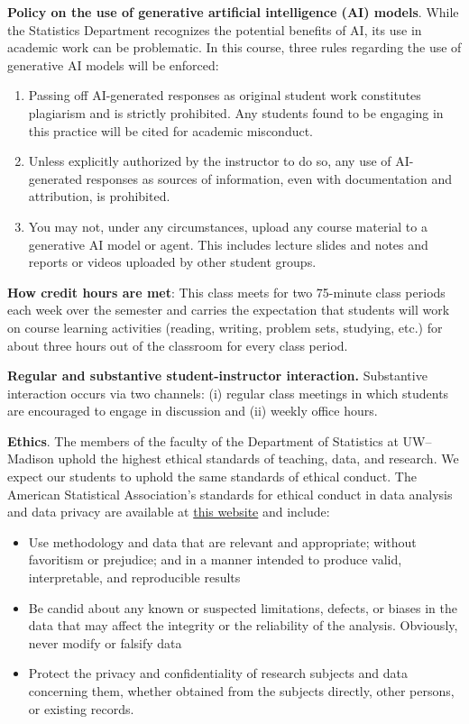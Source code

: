 \documentclass[11pt]{article}
\begin{document}
\textbf{Policy on the use of generative artificial intelligence (AI) models}.
While the Statistics Department recognizes the potential benefits of AI, its use in academic work can be problematic. In this course, three rules regarding the use of generative AI models will be enforced: 
\begin{enumerate}
\item{Passing off AI-generated responses as original student work constitutes plagiarism and is strictly prohibited. Any students found to be engaging in this practice will be cited for academic misconduct.}
\item{Unless explicitly authorized by the instructor to do so, any use of AI-generated responses as sources of information, even with documentation and attribution, is prohibited.}
\item{You may not, under any circumstances, upload any course material to a generative AI model or agent. This includes lecture slides and notes and reports or videos uploaded by other student groups.}
\end{enumerate}

\textbf{How credit hours are met}: This class meets for two 75-minute class periods each week over the semester and carries the expectation that students will work on course learning activities (reading, writing, problem sets, studying, etc.) for about three hours out of the classroom for every class period.

\textbf{Regular and substantive student-instructor interaction.} Substantive interaction occurs via two channels: (i) regular class meetings in which students are encouraged to engage in discussion and (ii) weekly office hours.

\textbf{Ethics}. The members of the faculty of the Department of Statistics at UW--Madison uphold the highest ethical standards of teaching, data, and research. We expect our students to uphold the same standards of ethical conduct. 
The American Statistical Association's standards for ethical conduct in data analysis and data privacy are available at \href{https://www.amstat.org/your-career/ethical-guidelines-for-statistical-practice}{this website} and include:
\begin{itemize}
\item{Use methodology and data that are relevant and appropriate; without favoritism or prejudice; and in a manner intended to produce valid, interpretable, and reproducible results}
\item{Be candid about any known or suspected limitations, defects, or biases in the data that may affect the integrity or the reliability of the analysis. Obviously, never modify or falsify data}
\item{Protect the privacy and confidentiality of research subjects and data concerning them, whether obtained from the subjects directly, other persons, or existing records.}
\end{itemize}
\end{document}
